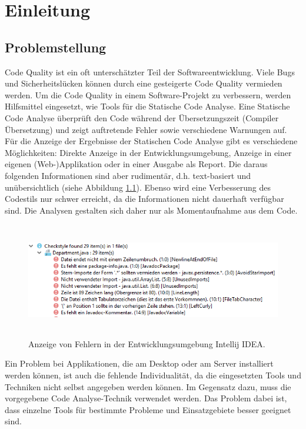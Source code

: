 \chapter{Einleitung}

\section{Problemstellung}
Code Quality ist ein oft unterschätzter Teil der Softwareentwicklung. Viele Bugs und Sicherheitslücken können durch eine gesteigerte Code Quality vermieden werden. Um die Code Quality in einem Software-Projekt zu verbessern, werden Hilfsmittel eingesetzt, wie Tools für die Statische Code Analyse. Eine Statische Code Analyse überprüft den Code während der Übersetzungszeit (Compiler Übersetzung) und zeigt auftretende Fehler sowie verschiedene Warnungen auf. Für die Anzeige der Ergebnisse der Statischen Code Analyse gibt es verschiedene Möglichkeiten: Direkte Anzeige in der Entwicklungsumgebung, Anzeige in einer eigenen (Web-)Applikation oder in einer Ausgabe als Report. Die daraus folgenden Informationen sind aber rudimentär, d.h. text-basiert und unübersichtlich (siehe Abbildung \ref{fig:findingsInIDE}). Ebenso wird eine Verbesserung des Codestils nur schwer erreicht, da die Informationen nicht dauerhaft verfügbar sind. Die Analysen gestalten sich daher nur als Momentaufnahme aus dem Code. 

\begin{figure}[tp]
  \centering
  \includegraphics[height=5cm]{images/ideChecks.PNG}
 \caption[Anzeige von Fehlern in der Entwicklungsumgebung Intellij IDEA]{Anzeige von Fehlern in der Entwicklungsumgebung Intellij IDEA.}
  \label{fig:findingsInIDE}
\end{figure}

Ein Problem bei Applikationen, die am Desktop oder am Server installiert werden können, ist auch die fehlende Individualität, da die eingesetzten Tools  und Techniken nicht selbst angegeben werden können. Im Gegensatz dazu, muss die vorgegebene Code Analyse-Technik verwendet werden. Das Problem dabei ist, dass einzelne Tools für bestimmte Probleme und Einsatzgebiete besser geeignet sind.

